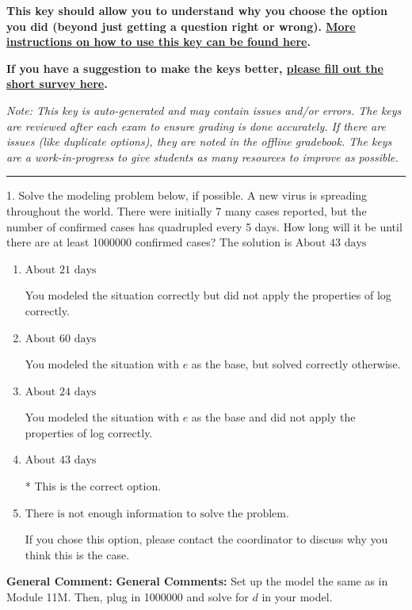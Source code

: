 \documentclass{extbook}[14pt]
\begin{document}
\textbf{This key should allow you to understand why you choose the option you did (beyond just getting a question right or wrong). \href{https://xronos.clas.ufl.edu/mac1105spring2020/courseDescriptionAndMisc/Exams/LearningFromResults}{More instructions on how to use this key can be found here}.}

\textbf{If you have a suggestion to make the keys better, \href{https://forms.gle/CZkbZmPbC9XALEE88}{please fill out the short survey here}.}

\textit{Note: This key is auto-generated and may contain issues and/or errors. The keys are reviewed after each exam to ensure grading is done accurately. If there are issues (like duplicate options), they are noted in the offline gradebook. The keys are a work-in-progress to give students as many resources to improve as possible.}

\rule{\textwidth}{0.4pt}

1. Solve the modeling problem below, if possible.
A new virus is spreading throughout the world. There were initially 7 many cases reported, but the number of confirmed cases has quadrupled every 5 days. How long will it be until there are at least 1000000 confirmed cases? 
The solution is $ \text{About } 43 \text{ days} $ 

\begin{enumerate}[label=\Alph*.] 
\item $ \text{About } 21 \text{ days} $ 

 You modeled the situation correctly but did not apply the properties of log correctly. 
\item $ \text{About } 60 \text{ days} $ 

 You modeled the situation with $e$ as the base, but solved correctly otherwise. 
\item $ \text{About } 24 \text{ days} $ 

 You modeled the situation with $e$ as the base and did not apply the properties of log correctly. 
\item $ \text{About } 43 \text{ days} $ 

 * This is the correct option. 
\item $ \text{There is not enough information to solve the problem.} $ 

 If you chose this option, please contact the coordinator to discuss why you think this is the case. 
\end{enumerate} 
 
\textbf{General Comment:} \textbf{General Comments:} Set up the model the same as in Module 11M. Then, plug in 1000000 and solve for $d$ in your model. 
\end{document}
